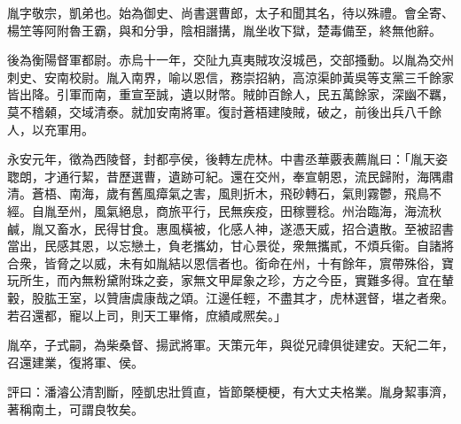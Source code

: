 \begin{pinyinscope}
 
胤字敬宗，凱弟也。始為御史、尚書選曹郎，太子和聞其名，待以殊禮。會全寄、楊笁等阿附魯王霸，與和分爭，陰相譖搆，胤坐收下獄，楚毒備至，終無他辭。
 
 
 
 
 後為衡陽督軍都尉。赤烏十一年，交阯九真夷賊攻沒城邑，交部搔動。以胤為交州刺史、安南校尉。胤入南界，喻以恩信，務崇招納，高涼渠帥黃吳等支黨三千餘家皆出降。引軍而南，重宣至誠，遺以財幣。賊帥百餘人，民五萬餘家，深幽不羈，莫不稽顙，交域清泰。就加安南將軍。復討蒼梧建陵賊，破之，前後出兵八千餘人，以充軍用。
 
 
 
 
 永安元年，徵為西陵督，封都亭侯，後轉左虎林。中書丞華覈表薦胤曰：「胤天姿聦朗，才通行絜，昔歷選曹，遺跡可紀。還在交州，奉宣朝恩，流民歸附，海隅肅清。蒼梧、南海，歲有舊風瘴氣之害，風則折木，飛砂轉石，氣則霧鬱，飛鳥不經。自胤至州，風氣絕息，商旅平行，民無疾疫，田稼豐稔。州治臨海，海流秋鹹，胤又畜水，民得甘食。惠風橫被，化感人神，遂憑天威，招合遺散。至被詔書當出，民感其恩，以忘戀土，負老攜幼，甘心景從，衆無攜貳，不煩兵衞。自諸將合衆，皆脅之以威，未有如胤結以恩信者也。銜命在州，十有餘年，賔帶殊俗，寶玩所生，而內無粉黛附珠之妾，家無文甲犀象之珍，方之今臣，實難多得。宜在輦轂，股肱王室，以贊唐虞康哉之頌。江邊任輕，不盡其才，虎林選督，堪之者衆。若召還都，寵以上司，則天工畢脩，庶績咸熈矣。」
 
 
 
 
 胤卒，子式嗣，為柴桑督、揚武將軍。天策元年，與從兄禕俱徙建安。天紀二年，召還建業，復將軍、侯。
 
 
 
 
 評曰：潘濬公清割斷，陸凱忠壯質直，皆節槩梗梗，有大丈夫格業。胤身絜事濟，著稱南土，可謂良牧矣。
 
 
\end{pinyinscope}